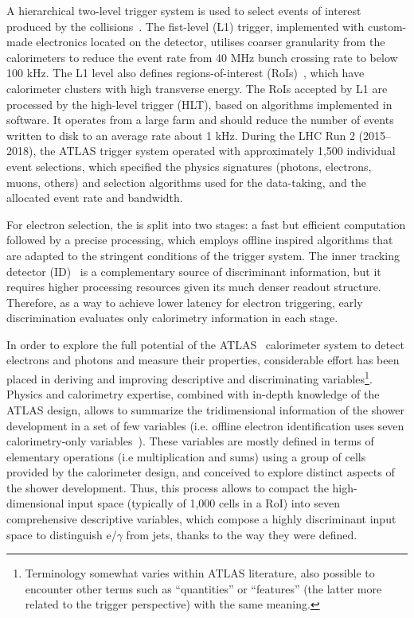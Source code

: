 A hierarchical two-level trigger system is used to select events of interest produced by the collisions~\cite{aad2020performance}. The fist-level (L1) trigger, implemented with custom-made electronics located on the detector, utilises coarser granularity from the calorimeters to reduce the event rate from 40 MHz bunch crossing rate to below 100 kHz. The L1 level also defines regions-of-interest (RoIs)~\cite{CERN-LHCC-2017-020}, which have calorimeter clusters with high transverse energy. The RoIs accepted by L1 are processed by the high-level trigger (HLT), based on algorithms implemented in software. It operates from a large farm and should reduce the number of events written to disk to an average rate about 1 kHz. During the LHC Run 2 (2015–2018), the ATLAS trigger system operated with approximately 1,500 individual event selections, which specified the physics signatures (photons, electrons, muons, others) and selection algorithms used for the data-taking, and the allocated event rate and bandwidth.

For electron selection, the \hlt{} is split into two stages: a fast but efficient computation followed by a precise processing, which employs offline inspired algorithms that are adapted to the stringent conditions of the trigger system. The inner tracking detector (ID)~\cite{PERF-2007-01} is a complementary source of discriminant information, but it requires higher processing resources given its much denser readout structure.  Therefore, as a way to achieve lower latency for electron triggering, early discrimination evaluates only calorimetry information in each stage.


In order to explore the full potential of the ATLAS~\cite{PERF-2007-01}
calorimeter system to detect electrons and photons and measure their properties, considerable effort has been placed in deriving and improving descriptive and discriminating variables\footnote{Terminology somewhat varies within ATLAS literature, also possible to encounter other terms such as ``quantities'' or ``features'' (the latter more related to the trigger
perspective) with the same meaning.}. Physics and calorimetry expertise,
combined with in-depth knowledge of the ATLAS design, allows to summarize the tridimensional information of the shower development in a set of few
variables (i.e. offline electron identification uses seven calorimetry-only
variables~\cite{aaboud2019electron}). These variables are mostly defined in
terms of elementary operations (i.e multiplication and sums) using a group of cells provided by the calorimeter
design, and conceived to explore distinct aspects of the shower development. Thus, this process allows to compact the high-dimensional input space (typically of 1,000 cells in a RoI) into seven comprehensive descriptive variables, which compose a highly discriminant input space to distinguish e/$\gamma$ from jets, thanks to the way they were defined.

